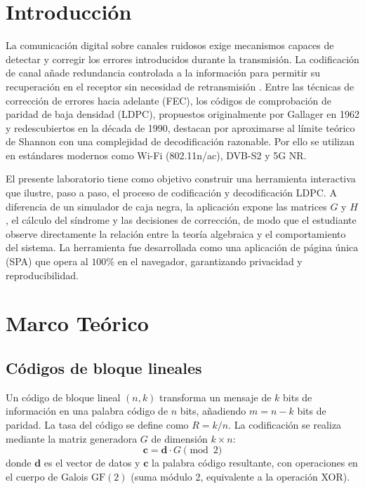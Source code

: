 \documentclass[conference]{IEEEtran}
\begin{document}
\section{Introducción}
La comunicación digital sobre canales ruidosos exige mecanismos capaces de detectar y corregir los errores introducidos durante la transmisión. La codificación de canal añade redundancia controlada a la información para permitir su recuperación en el receptor sin necesidad de retransmisión \cite{shannon1948}. Entre las técnicas de corrección de errores hacia adelante (FEC), los códigos de comprobación de paridad de baja densidad (LDPC), propuestos originalmente por Gallager en 1962 \cite{gallager1962} y redescubiertos en la década de 1990, destacan por aproximarse al límite teórico de Shannon con una complejidad de decodificación razonable. Por ello se utilizan en estándares modernos como Wi-Fi (802.11n/ac), DVB-S2 y 5G NR.

El presente laboratorio tiene como objetivo construir una herramienta interactiva que ilustre, paso a paso, el proceso de codificación y decodificación LDPC. A diferencia de un simulador de caja negra, la aplicación expone las matrices $G$ y $H$, el cálculo del síndrome y las decisiones de corrección, de modo que el estudiante observe directamente la relación entre la teoría algebraica y el comportamiento del sistema. La herramienta fue desarrollada como una aplicación de página única (SPA) que opera al $100\%$ en el navegador, garantizando privacidad y reproducibilidad.

\section{Marco Teórico}

\subsection{Códigos de bloque lineales}
Un código de bloque lineal $(n,k)$ transforma un mensaje de $k$ bits de información en una palabra código de $n$ bits, añadiendo $m = n-k$ bits de paridad. La tasa del código se define como $R = k/n$. La codificación se realiza mediante la matriz generadora $G$ de dimensión $k \times n$:
\begin{equation}
\mathbf{c} = \mathbf{d} \cdot G \pmod{2}
\end{equation}
donde $\mathbf{d}$ es el vector de datos y $\mathbf{c}$ la palabra código resultante, con operaciones en el cuerpo de Galois $\mathrm{GF}(2)$ (suma módulo 2, equivalente a la operación XOR).
\end{document}
